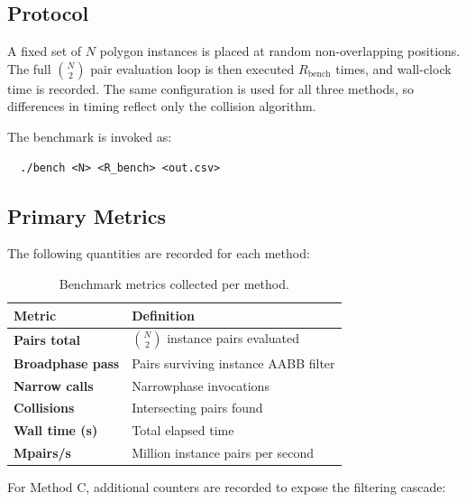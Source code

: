\subsection{Protocol}

A fixed set of $N$ polygon instances is placed at random non-overlapping
positions. The full $\binom{N}{2}$ pair evaluation loop is then executed
$R_{\mathrm{bench}}$ times, and wall-clock time is recorded. The same
configuration is used for all three methods, so differences in timing
reflect only the collision algorithm.

The benchmark is invoked as:
\begin{verbatim}
  ./bench <N> <R_bench> <out.csv>
\end{verbatim}

\subsection{Primary Metrics}

The following quantities are recorded for each method:

\begin{table}[h]
\centering
\caption{Benchmark metrics collected per method.}
\label{tab:bench-metrics}
\begin{tabular}{ll}
\toprule
Metric & Definition \\
\midrule
\textbf{Pairs total} & $\binom{N}{2}$ instance pairs evaluated \\
\textbf{Broadphase pass} & Pairs surviving instance AABB filter \\
\textbf{Narrow calls} & Narrowphase invocations \\
\textbf{Collisions} & Intersecting pairs found \\
\textbf{Wall time (s)} & Total elapsed time \\
\textbf{Mpairs/s} & Million instance pairs per second \\
\bottomrule
\end{tabular}
\end{table}

For Method C, additional counters are recorded to expose the filtering
cascade:

